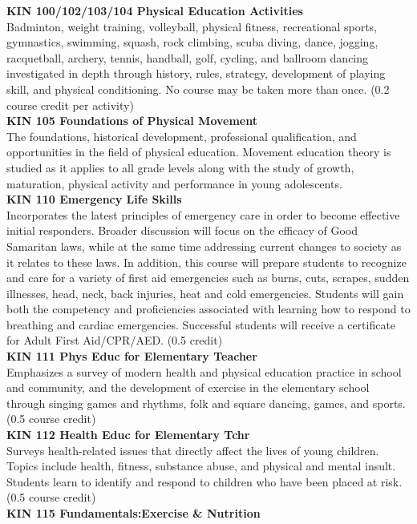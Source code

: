 \documentclass[
  letterpaper,
]{scrbook}
\begin{document}
\textbf{KIN 100/102/103/104 Physical Education Activities}\\
Badminton, weight training, volleyball, physical fitness, recreational
sports, gymnastics, swimming, squash, rock climbing, scuba diving,
dance, jogging, racquetball, archery, tennis, handball, golf, cycling,
and ballroom dancing investigated in depth through history, rules,
strategy, development of playing skill, and physical conditioning. No
course may be taken more than once. (0.2 course credit per activity)\\
\textbf{KIN 105 Foundations of Physical Movement}\\
The foundations, historical development, professional qualification, and
opportunities in the field of physical education. Movement education
theory is studied as it applies to all grade levels along with the study
of growth, maturation, physical activity and performance in young
adolescents.\\
\textbf{KIN 110 Emergency Life Skills}\\
Incorporates the latest principles of emergency care in order to become
effective initial responders. Broader discussion will focus on the
efficacy of Good Samaritan laws, while at the same time addressing
current changes to society as it relates to these laws. In addition,
this course will prepare students to recognize and care for a variety of
first aid emergencies such as burns, cuts, scrapes, sudden illnesses,
head, neck, back injuries, heat and cold emergencies. Students will gain
both the competency and proficiencies associated with learning how to
respond to breathing and cardiac emergencies. Successful students will
receive a certificate for Adult First Aid/CPR/AED. (0.5 credit)\\
\textbf{KIN 111 Phys Educ for Elementary Teacher}\\
Emphasizes a survey of modern health and physical education practice in
school and community, and the development of exercise in the elementary
school through singing games and rhythms, folk and square dancing,
games, and sports. (0.5 course credit)\\
\textbf{KIN 112 Health Educ for Elementary Tchr}\\
Surveys health-related issues that directly affect the lives of young
children. Topics include health, fitness, substance abuse, and physical
and mental insult. Students learn to identify and respond to children
who have been placed at risk. (0.5 course credit)\\
\textbf{KIN 115 Fundamentals:Exercise \& Nutrition}\\
\end{document}
